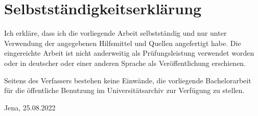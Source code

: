 \documentclass[12pt, a4paper]{report} %
\begin{document}
\chapter*{Selbstständigkeitserklärung}
Ich erkläre, dass ich die vorliegende Arbeit selbstständig und nur unter Verwendung der angegebenen Hilfsmittel und Quellen angefertigt habe.
Die eingereichte Arbeit ist nicht anderweitig als Prüfungsleistung verwendet worden oder in deutscher oder einer anderen Sprache als Veröffentlichung erschienen.

\setlength{\parindent}{0pt}
\vspace{10pt}
Seitens des Verfassers bestehen keine Einwände, die vorliegende Bachelorarbeit für die öffentliche Benutzung im Universitätsarchiv zur Verfügung zu stellen. \vspace{80pt}

Jena, 25.08.2022
\end{document}
